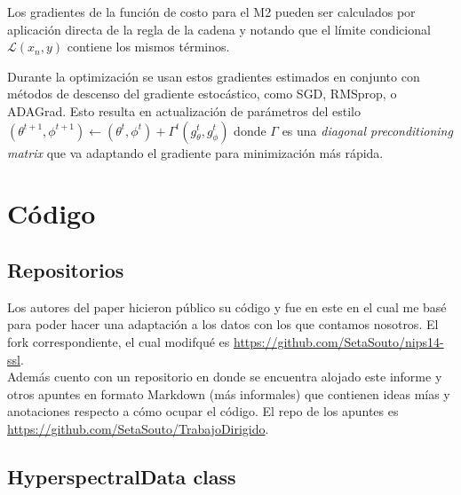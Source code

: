 \documentclass[letterpaper,11pt]{article} %
\begin{document}
	Los gradientes de la función de costo para el M2 pueden ser calculados por aplicación directa de la regla de la cadena y notando que el límite condicional $\mathcal{L}(x_{n},y)$ contiene los mismos términos.
	
	Durante la optimización se usan estos gradientes estimados en conjunto con métodos de descenso del gradiente estocástico, como SGD, RMSprop, o ADAGrad. Esto resulta en actualización de parámetros del estilo $(\theta^{t+1}, \phi^{t+1}) \leftarrow (\theta^{t}, \phi^{t}) + \Gamma^{t}(g^{t}_{\theta}, g^{t}_{\phi})$ donde $\Gamma$ es una \textit{diagonal preconditioning matrix} que va adaptando el gradiente para minimización más rápida.
	
\newpage

\section{Código}

\subsection{Repositorios}

	Los autores del paper hicieron público su código y fue en este en el cual me basé para poder hacer una adaptación a los datos con los que contamos nosotros. El fork correspondiente, el cual modifqué es \url{https://github.com/SetaSouto/nips14-ssl}.\\
	Además cuento con un repositorio en donde se encuentra alojado este informe y otros apuntes en formato Markdown (más informales) que contienen ideas mías y anotaciones respecto a cómo ocupar el código. El repo de los apuntes es \url{https://github.com/SetaSouto/TrabajoDirigido}.
	
\subsection{HyperspectralData class}
\end{document}
